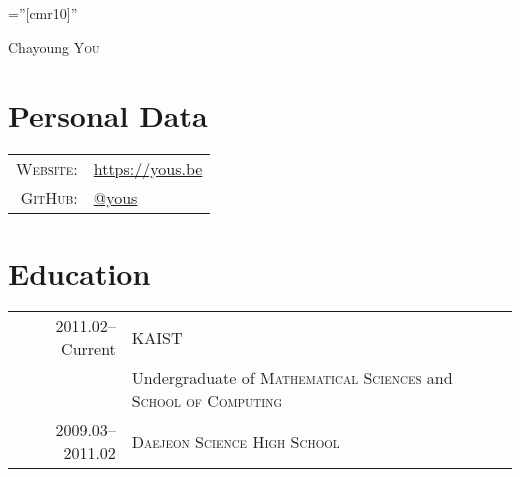 \documentclass[a4paper,10pt]{article}
\begin{document}

\pagestyle{empty} %

\font\fb=''[cmr10]'' %

\par{\centering
{\Huge Chayoung \textsc{You}
}\bigskip\par}

\section{Personal Data}

\begin{tabular}{rl}
  \textsc{Website:}   & \url{https://yous.be} \\
  \textsc{GitHub:}    & \href{https://github.com/yous}{@yous} \\
\end{tabular}

\section{Education}
\begin{tabular}{rl}
  2011.02--Current & \textsc{KAIST} \\
  & Undergraduate of \textsc{Mathematical Sciences} and \textsc{School of Computing} \\
  2009.03--2011.02 & \textsc{Daejeon Science High School}
\end{tabular}

\end{document}
